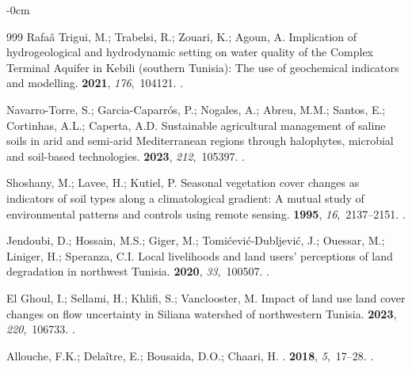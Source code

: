 \documentclass[land,article,accept,pdftex,moreauthors]{Definitions/mdpi}
\begin{document}
\begin{adjustwidth}{-\extralength}{0cm}
\begin{thebibliography}{999}
{Rafaâ Trigui}, M.; Trabelsi, R.; Zouari, K.; Agoun, A.
\newblock Implication of hydrogeological and hydrodynamic setting on water
  quality of the Complex Terminal Aquifer in Kebili (southern Tunisia): The use
  of geochemical indicators and modelling.
 {\bf 2021}, {\em
  176},~104121.
.

Navarro-Torre, S.; Garcia-Caparrós, P.; Nogales, A.; Abreu, M.M.; Santos, E.;
  Cortinhas, A.L.; Caperta, A.D.
\newblock Sustainable agricultural management of saline soils in arid and
  semi-arid Mediterranean regions through halophytes, microbial and soil-based
  technologies.
 {\bf 2023}, {\em
  212},~105397.
.

Shoshany, M.; Lavee, H.; Kutiel, P.
\newblock Seasonal vegetation cover changes as indicators of soil types along a
  climatological gradient: A mutual study of environmental patterns and
  controls using remote sensing.
 {\bf 1995}, {\em
  16},~2137--2151.
.

Jendoubi, D.; Hossain, M.S.; Giger, M.; Tomićević-Dubljević, J.; Ouessar,
  M.; Liniger, H.; Speranza, C.I.
\newblock Local livelihoods and land users’ perceptions of land degradation
  in northwest Tunisia.
 {\bf 2020}, {\em 33},~100507.
.

{El Ghoul}, I.; Sellami, H.; Khlifi, S.; Vanclooster, M.
\newblock Impact of land use land cover changes on flow uncertainty in Siliana
  watershed of northwestern Tunisia.
 {\bf 2023}, {\em 220},~106733.
.

Allouche, F.K.; Delaître, E.; Bousaida, D.O.; Chaari, H.
.
 {\bf
  2018}, {\em 5},~17--28.
.


\end{thebibliography}
\end{adjustwidth}
\end{document}
